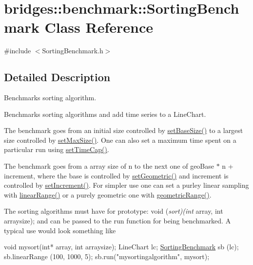 \hypertarget{classbridges_1_1benchmark_1_1_sorting_benchmark}{}\section{bridges\+:\+:benchmark\+:\+:Sorting\+Benchmark Class Reference}
\label{classbridges_1_1benchmark_1_1_sorting_benchmark}


{\ttfamily \#include $<$Sorting\+Benchmark.\+h$>$}



\subsection{Detailed Description}
Benchmarks sorting algorithm. 

Benchmarks sorting algorithms and add time series to a Line\+Chart.

The benchmark goes from an initial size controlled by \hyperlink{classbridges_1_1benchmark_1_1_sorting_benchmark_afe0474d148c185ed1e479ff11f42ae51}{set\+Base\+Size()} to a largest size controlled by \hyperlink{classbridges_1_1benchmark_1_1_sorting_benchmark_abdca289b823c7f240b648e248c07b059}{set\+Max\+Size()}. One can also set a maximum time spent on a particular run using \hyperlink{classbridges_1_1benchmark_1_1_sorting_benchmark_a59b95f2510d62ac5a31bb33d472fdffc}{set\+Time\+Cap()}.

The benchmark goes from a array size of n to the next one of geo\+Base $\ast$ n + increment, where the base is controlled by \hyperlink{classbridges_1_1benchmark_1_1_sorting_benchmark_ade76a5749b07d35b02623cce27c046ab}{set\+Geometric()} and increment is controlled by \hyperlink{classbridges_1_1benchmark_1_1_sorting_benchmark_ae168533dc5756f3ede3436bdd7840047}{set\+Increment()}. For simpler use one can set a purley linear sampling with \hyperlink{classbridges_1_1benchmark_1_1_sorting_benchmark_a993de51c8b82ec50eb186afef5dc7003}{linear\+Range()} or a purely geometric one with \hyperlink{classbridges_1_1benchmark_1_1_sorting_benchmark_a32fa712ee712b633aabfd7bcaa83008a}{geometric\+Range()}.

The sorting algorithms must have for prototype\+: void ({\itshape sort)(int} array, int arraysize); and can be passed to the run function for being benchmarked. A typical use would look something like


\begin{DoxyCode}
\textcolor{keywordtype}{void} mysort(\textcolor{keywordtype}{int}* array, \textcolor{keywordtype}{int} arraysize);
LineChart lc;
\hyperlink{classbridges_1_1benchmark_1_1_sorting_benchmark_aed5731a3b5add3a7f4c80891b22b3093}{SortingBenchmark} sb (lc);
sb.linearRange (100, 1000, 5);
sb.run(\textcolor{stringliteral}{"mysortingalgorithm"}, mysort);
\end{DoxyCode}


